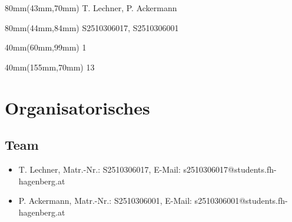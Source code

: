 

\newcommand{\docproject}{Player-Schnittstelle}			%
\newcommand{\docsubject}{Software Design Patterns}	%
\newcommand{\docsubjectshort}{SDP3}					%
\newcommand{\docexercise}{Übung 3}					%
\newcommand{\docauthor}{T. Lechner}					%
\newcommand{\doccoauthor}{P. Ackermann}				%
\newcommand{\docauthornumber}{S2510306017}			%
\newcommand{\doccoauthornumber}{S2510306001}		%
\newcommand{\docauthoremail}{s2510306017@students.fh-hagenberg.at}
\newcommand{\doccoauthoremail}{s2510306001@students.fh-hagenberg.at}
\newcommand{\docdate}{\date}						%
\newcommand{\docsemester}{Wintersemester 2026/2027}	%




\begin{textblock*}{80mm}(43mm,70mm)
	\docauthor, \doccoauthor
\end{textblock*}
\begin{textblock*}{80mm}(44mm,84mm)
	\docauthornumber, \doccoauthornumber
\end{textblock*}
\begin{textblock*}{40mm}(60mm,99mm)
	1 					%
\end{textblock*}
\begin{textblock*}{40mm}(155mm,70mm)
	13					%
\end{textblock*}


\newpage
\hgbtitle
\newpage



\tableofcontents
\newpage


\section{Organisatorisches}

\subsection{Team}
\begin{itemize}
	\item \docauthor, Matr.-Nr.: \docauthornumber, E-Mail: \docauthoremail	
	\item \doccoauthor, Matr.-Nr.: \doccoauthornumber, E-Mail: \doccoauthoremail
\end{itemize}

